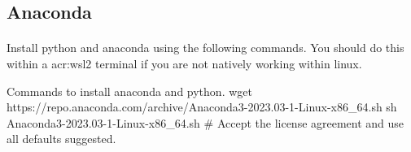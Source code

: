 \subsection{Anaconda}
    \paragraph{}
    Install python and anaconda using the following commands. You should do this within a \gls{acr:wsl2} terminal if you are not natively working within linux.
    \begin{bashcmd}[label=listing:ANACONDAINST]{Commands to install anaconda and python.}
    wget https://repo.anaconda.com/archive/Anaconda3-2023.03-1-Linux-x86_64.sh
    sh Anaconda3-2023.03-1-Linux-x86_64.sh
    # Accept the license agreement and use all defaults suggested.
    \end{bashcmd}